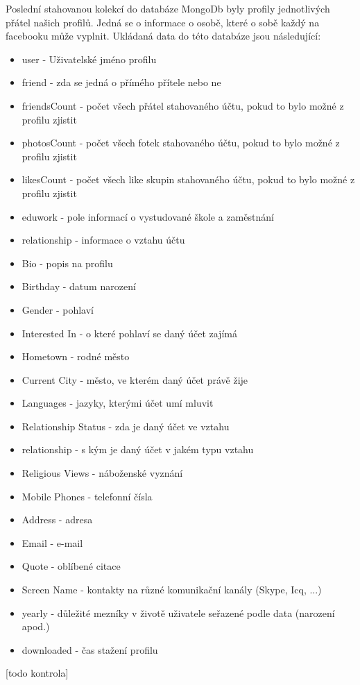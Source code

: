 \documentclass[thesis=M,czech]{FITthesis}[2013/05/10]
\begin{document}
Poslední stahovanou kolekcí do databáze MongoDb byly profily jednotlivých přátel našich profilů. Jedná se o informace o osobě, které o sobě každý na facebooku může vyplnit. Ukládaná data do této databáze jsou následující:

\begin{itemize}
  \item user - Uživatelské jméno profilu
  \item friend - zda se jedná o přímého přítele nebo ne
  \item friendsCount - počet všech přátel stahovaného účtu, pokud to bylo možné z profilu zjistit
  \item photosCount - počet všech fotek stahovaného účtu, pokud to bylo možné z profilu zjistit
  \item likesCount - počet všech like skupin stahovaného účtu, pokud to bylo možné z profilu zjistit
  \item eduwork - pole informací o vystudované škole a zaměstnání
  \item relationship - informace o vztahu účtu
  \item Bio - popis na profilu
  \item Birthday - datum narození 
  \item Gender - pohlaví
  \item Interested In - o které pohlaví se daný účet zajímá
  \item Hometown - rodné město
  \item Current City - město, ve kterém daný účet právě žije
  \item Languages - jazyky, kterými účet umí mluvit
  \item Relationship Status - zda je daný účet ve vztahu
  \item relationship - s kým je daný účet v jakém typu vztahu
  \item Religious Views - náboženské vyznání
  \item Mobile Phones - telefonní čísla
  \item Address - adresa
  \item Email - e-mail
  \item Quote - oblíbené citace
  \item Screen Name - kontakty na různé komunikační kanály (Skype, Icq, ...)
  \item yearly - důležité mezníky v životě uživatele seřazené podle data (narození apod.)
  \item downloaded - čas stažení profilu
\end{itemize}
[todo kontrola]
\end{document}
